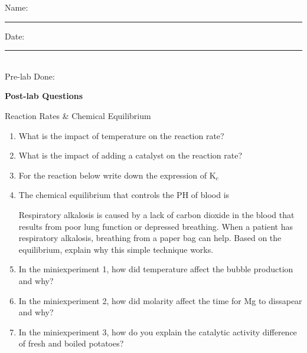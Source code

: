 \documentclass[main.tex]{subfiles}
\begin{document}
\clearpage\mbox{}\clearpage

\newpage
\begin{multicols}{2}
\begin{tcolorbox}[enhanced jigsaw,breakable,size=title,
colback=mybrown!05,colframe=black,fonttitle=\bfseries,
title=STUDENT INFO,pad at break=1mm, break at=15cm/0pt ]
\vspace{0.2cm}
\noindent Name: \rule{5cm}{0.4pt}Date:\rule{1cm}{0.4pt}\\
Pre-lab Done: \quad
\end{tcolorbox}
\end{multicols}
\hfill
\vspace{0.2cm}
\begin{center}
{\large \bfseries 
Post-lab Questions 
\par
\Huge
Reaction Rates \&  Chemical Equilibrium   
\\[5pt] \par}
\vspace{0.2cm}
\end{center}
\par
\noindent
\uline{  \hfill \normalsize \hfill       }



 
\begin{enumerate}
\item{} What is the impact of temperature on the reaction rate? 
\vspace{1.5cm}
\item{} What is the impact of adding a catalyst on the reaction rate?
\vspace{1.5cm}
\item{} For the reaction below write down the expression of K$_c$ 
\begin{center}\end{center}
\item{}  The chemical equilibrium that controls the PH of blood is
\begin{center}\end{center}
Respiratory  alkalosis is caused by a lack of carbon dioxide in the blood that results from poor lung function or depressed breathing. When a patient has respiratory alkalosis, breathing from a paper bag can help. Based on the equilibrium, explain why this simple technique works.

\item{} In the miniexperiment 1, how did temperature affect the bubble production and why?\vspace{1.5cm}
\item{} In the miniexperiment 2, how did molarity affect the time for Mg to dissapear and why?\vspace{1.5cm}
\item{} In the miniexperiment 3, how do you explain the catalytic activity difference of fresh and boiled potatoes?\vspace{1.5cm}


\end{enumerate}


 


 


 
\end{document}
